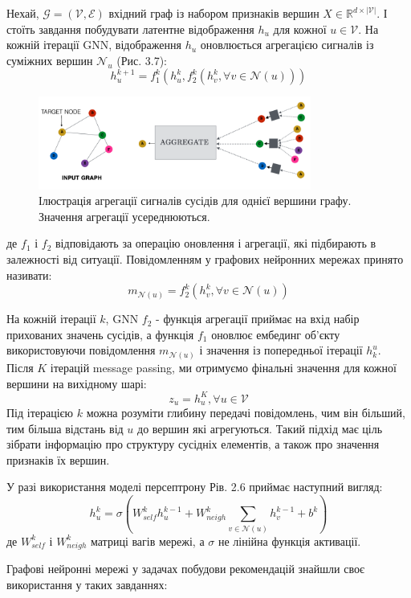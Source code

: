 Нехай, $\mathcal{G} = (\mathcal{V}, \mathcal{E})$ вхідний граф із набором признаків вершин $X \in \mathbb{R}^{d \times |\mathcal{V}|}$. І стоїть завдання побудувати латентне відображення $h_u$  для кожної $u \in\mathcal{V}$. На кожній ітерації GNN, відображення $h_u$ оновлюється агрегацією сигналів
із суміжних вершин  $\mathcal{N}_u$ (Рис. 3.7):
\[ h_u^{k + 1} = f_1^{k}(h_u^{k}, f_2^{k}({h_v^{k}, \forall v \in \mathcal{N}(u)}))\]
\begin{figure}
    \centering
\includegraphics[width=0.8\textwidth]{images/Message_passing.png}
\caption{Ілюстрація агрегації сигналів сусідів для однієї вершини графу. Значення агрегації усереднюються.}
\end{figure}
де $f_1$ і $f_2$ відповідають за операцію оновлення і агрегації, які підбирають в залежності від ситуації. Повідомленням у графових нейронних мережах принято називати:
\[ m_{\mathcal{N}(u)} = f_2^{k}({h_v^{k}, \forall v \in \mathcal{N}(u)})\]

На кожній ітерації $k$, GNN $f_2$ - функція агрегації приймає на вхід набір прихованих значень сусідів, а функція $f_1$ оновлює ембединг об’єкту використовуючи повідомлення $m_{\mathcal{N}(u)}$ і значення із попередньої ітерації $h_k^{u}$.  Після  $K$ ітерацій message passing, ми отримуємо фінальні значення для кожної вершини на вихідному шарі:
\[z_u = h_u^{K}, \forall u \in \mathcal{V}\]
Під ітерацією $k$ можна розуміти глибину передачі повідомлень, чим він більший, тим більша відстань від $u$ до вершин які агрегуються. Такий підхід має ціль зібрати інформацію про структуру сусідніх елементів, а також про значення признаків їх вершин.

У разі використання моделі персептрону  Рів. 2.6 приймає наступний вигляд:
\[ h_u^{k} = \sigma \left(W_{self}^{k} h_u^{k-1} + W_{neigh}^{k} \sum_{v \in \mathcal{N}(u)} h_v^{k-1} + b^{k}\right)\]
де $W_{self}^{k}$ і $W_{neigh}^{k}$ матриці вагів мережі, а $\sigma$ не лінійна функція активації.

Графові нейронні мережі у задачах побудови рекомендацій знайшли своє використання у таких завданнях:

